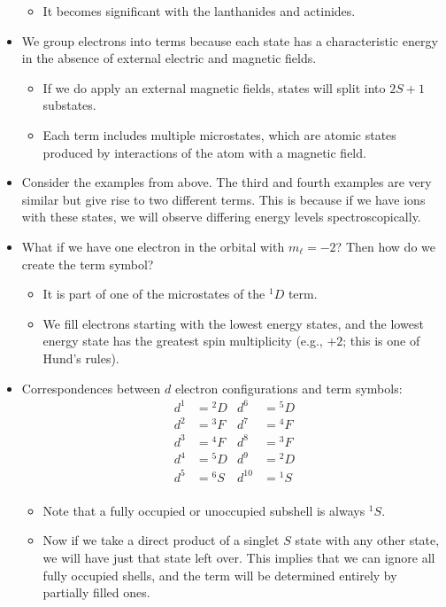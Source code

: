 \documentclass[../notes.tex]{subfiles}
\begin{document}
\begin{itemize}
    \begin{itemize}
        \item It becomes significant with the lanthanides and actinides.
    \end{itemize}
    \item We group electrons into terms because each state has a characteristic energy in the absence of external electric and magnetic fields.
    \begin{itemize}
        \item If we do apply an external magnetic fields, states will split into $2S+1$ substates.
        \item Each term includes multiple microstates, which are atomic states produced by interactions of the atom with a magnetic field.
    \end{itemize}
    \item Consider the examples from above. The third and fourth examples are very similar but give rise to two different terms. This is because if we have ions with these states, we will observe differing energy levels spectroscopically.
    \item What if we have one electron in the orbital with $m_\ell=-2$? Then how do we create the term symbol?
    \begin{itemize}
        \item It is part of one of the microstates of the ${}^1D$ term.
        \item We fill electrons starting with the lowest energy states, and the lowest energy state has the greatest spin multiplicity (e.g., $+2$; this is one of Hund's rules).
    \end{itemize}
    \item Correspondences between $d$ electron configurations and term symbols:
    \begin{align*}
        d^1 &= {}^2D&
            d^6 &= {}^5D\\
        d^2 &= {}^3F&
            d^7 &= {}^4F\\
        d^3 &= {}^4F&
            d^8 &= {}^3F\\
        d^4 &= {}^5D&
            d^9 &= {}^2D\\
        d^5 &= {}^6S&
            d^{10} &= {}^1S\\
    \end{align*}
    \begin{itemize}
        \item Note that a fully occupied or unoccupied subshell is always ${}^1S$.
        \item Now if we take a direct product of a singlet $S$ state with any other state, we will have just that state left over. This implies that we can ignore all fully occupied shells, and the term will be determined entirely by partially filled ones.

\end{itemize}
\end{itemize}
\end{document}
